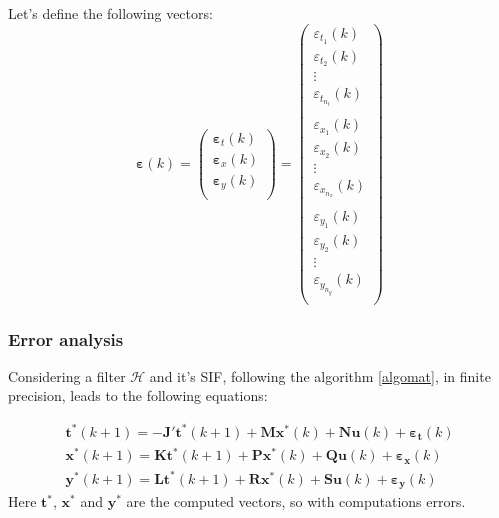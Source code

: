 	Let's define the following vectors:
	\begin{equation}
		\boldsymbol{\varepsilon}(k) =
		\begin{pmatrix}
			\boldsymbol{\varepsilon}_t(k) \\
			\boldsymbol{\varepsilon}_x(k) \\
			\boldsymbol{\varepsilon}_y(k) \\
		\end{pmatrix}
		=
		\begin{pmatrix}
			{\varepsilon}_{t_1}(k) \\
			{\varepsilon}_{t_2}(k) \\
			\vdots \\
			{\varepsilon}_{t_{n_t}}(k) \\
			\hspace{5pt} \\
			{\varepsilon}_{x_1}(k) \\
			{\varepsilon}_{x_2}(k) \\
			\vdots \\
			{\varepsilon}_{x_{n_x}}(k) \\
			\hspace{5pt} \\
			{\varepsilon}_{y_1}(k) \\
			{\varepsilon}_{y_2}(k) \\
			\vdots \\
			{\varepsilon}_{y_{n_y}}(k) \\
		\end{pmatrix}
	\end{equation}


		
	\subsubsection{Error analysis}

	Considering a filter $\mathcal{H}$ and it’s SIF, following
	the algorithm \ref{algomat}, in finite precision, leads to the following equations:

			\begin{eqnarray} \label{sifalgoerr}
				\boldsymbol{t}^*(k+1) = - \boldsymbol{J'}\boldsymbol{t}^*(k+1) + \boldsymbol{M} \boldsymbol{x}^*(k) + \boldsymbol{N} \boldsymbol{u}(k) + \boldsymbol{\varepsilon_t}(k)\\
				\boldsymbol{x}^*(k+1) = \boldsymbol{K}\boldsymbol{t}^*(k+1) + \boldsymbol{P} \boldsymbol{x}^*(k) + \boldsymbol{Q} \boldsymbol{u}(k) + \boldsymbol{\varepsilon_x}(k) \\
				\boldsymbol{y}^*(k+1) = \boldsymbol{L}\boldsymbol{t}^*(k+1) + \boldsymbol{R} \boldsymbol{x}^*(k) + \boldsymbol{S} \boldsymbol{u}(k) + \boldsymbol{\varepsilon_y}(k) 
			\end{eqnarray}
			Here $\boldsymbol{t}^*$, $\boldsymbol{x}^*$ and $\boldsymbol{y}^*$ are the computed vectors, so with computations errors.

